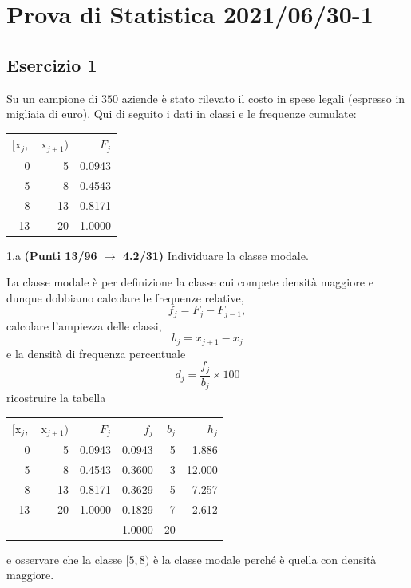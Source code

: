 \documentclass[
  11pt,
]{book}
\theoremstyle{mytheoremstyle}
\theoremstyle{mydefstyle}
\newenvironment{sol}
  {
  \begin{tcolorbox}[enhanced,breakable,arc=0.1mm,boxrule=1pt,colback=white,colframe=iblue,
  title=\bf \fontfamily{lmss}\selectfont \hspace{.5 cm} Soluzione,drop fuzzy shadow]

}{
\end{tcolorbox}
  }
\begin{document}
\section{Prova di Statistica 2021/06/30-1}\label{prova-di-statistica-20210630-1}

\subsection{Esercizio 1}\label{esercizio-1-5}

Su un campione di \(350\) aziende è stato rilevato il costo in spese legali (espresso in migliaia di euro). Qui di seguito i dati in classi e le frequenze cumulate:

\begin{table}[H]
\centering
\begin{tabular}{rrr}
\toprule
$[\text{x}_j,$ & $\text{x}_{j+1})$ & $F_j$\\
\midrule
0 & 5 & 0.0943\\
5 & 8 & 0.4543\\
8 & 13 & 0.8171\\
13 & 20 & 1.0000\\
\bottomrule
\end{tabular}
\end{table}

1.a \textbf{(Punti 13/96 \(\rightarrow\) 4.2/31)} Individuare la classe modale.

\begin{sol}

La classe modale è per definizione la classe cui compete densità maggiore e dunque dobbiamo calcolare
le frequenze relative,
\[
f_j=F_j-F_{j-1},
\]
calcolare l'ampiezza delle classi,
\[
b_j=x_{j+1}-x_{j}
\]
e la densità di frequenza percentuale
\[
d_j=\frac{f_j}{b_j}\times 100
\]
ricostruire la tabella

\begin{table}[H]
\centering
\begin{tabular}{rrrrrr}
\toprule
$[\text{x}_j,$ & $\text{x}_{j+1})$ & $F_j$ & $f_j$ & $b_j$ & $h_j$\\
\midrule
0 & 5 & 0.0943 & 0.0943 & 5 & 1.886\\
5 & 8 & 0.4543 & 0.3600 & 3 & 12.000\\
8 & 13 & 0.8171 & 0.3629 & 5 & 7.257\\
13 & 20 & 1.0000 & 0.1829 & 7 & 2.612\\
 &  &  & 1.0000 & 20 & \\
\bottomrule
\end{tabular}
\end{table}

e osservare che la classe \([5,8)\) è la classe modale perché è quella con densità maggiore.

\end{sol}
\end{document}
